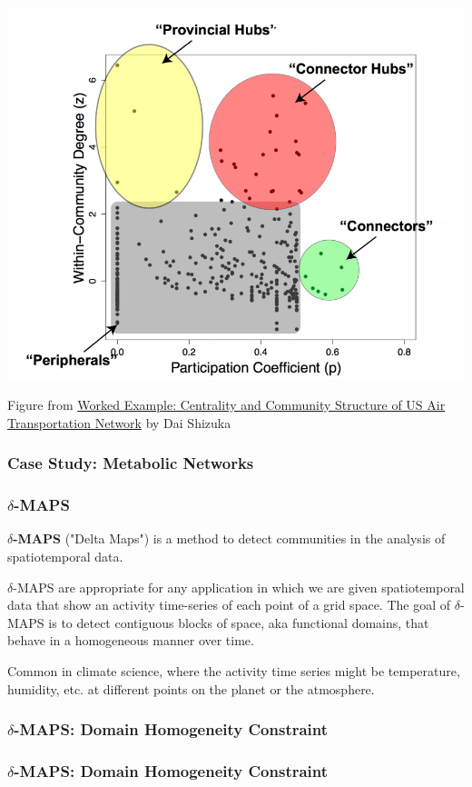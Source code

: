 \documentclass[11pt]{scrartcl} %
\begin{document}
\begin{center}
\includegraphics[width=0.75\linewidth]{img/L8.2-WithinModuleDegree.PNG}

{\tiny Figure from \href{https://dshizuka.github.io/networkanalysis/example_usairports.html}{Worked Example: Centrality and Community Structure of US Air Transportation Network} by Dai Shizuka}
\end{center}

\subsubsection{Case Study: Metabolic Networks}
\subsubsection{$\delta$-MAPS}
\textbf{$\delta$-MAPS} ("Delta Maps") is a method to detect communities in the analysis of spatiotemporal data. 

$\delta$-MAPS are appropriate for any application in which we are given spatiotemporal data that show an activity time-series of each point of a grid space. The goal of $\delta$-MAPS is to detect contiguous blocks of space, aka functional domains, that behave in a homogeneous manner over time. 

Common in climate science, where the activity time series might be temperature, humidity, etc. at different points on the planet or the atmosphere. 


\subsubsection{$\delta$-MAPS: Domain Homogeneity Constraint}
\subsubsection{$\delta$-MAPS: Domain Homogeneity Constraint}
\end{document}
